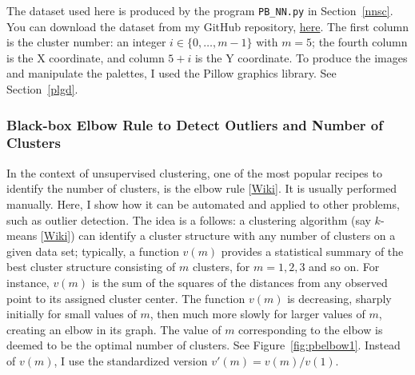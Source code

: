 \documentclass[10pt]{article}
\begin{document}
The dataset used here is produced by the program \texttt{PB\_NN.py} in Section~\ref{nnsc}. You can download the dataset from my
GitHub repository, \href{https://github.com/VincentGranville/Point-Processes/blob/main/Data/PB_NN.txt}{here}. The first column is
the cluster number: an integer $i\in\{0,\dots,m-1\}$ with $m=5$; the fourth column is the X coordinate, and column $5+i$ is the Y coordinate. To produce
the images and manipulate the palettes, I used the Pillow graphics library. See
Section~\ref{plgd}.

\subsubsection{Black-box Elbow Rule to Detect Outliers and Number of Clusters}\label{bbcl}

In the context of unsupervised clustering, one of the most popular recipes to identify the number of clusters, is the 
\textcolor{index}{elbow rule} [\href{https://en.wikipedia.org/wiki/Elbow_method_(clustering)}{Wiki}]. It is usually performed manually. Here, I show how it can be automated and applied to other problems, such as outlier detection. The idea is a follows: a clustering algorithm (say $k$-means 
[\href{https://en.wikipedia.org/wiki/K-means_clustering}{Wiki}]) can identify a cluster structure with any number of clusters on a given data set; typically, a function $v(m)$ provides a statistical summary of the best cluster structure consisting of $m$ clusters, for $m=1,2,3$ and so on. For instance, $v(m)$ is the sum of the squares of the distances from any observed point to its assigned cluster center.
The function $v(m)$ is decreasing, sharply initially for small values of $m$, then much more slowly for larger values of $m$, creating an elbow in its graph.  The value of $m$ corresponding to the elbow is deemed to be the optimal number of clusters. See Figure~\ref{fig:pbelbow1}. Instead of $v(m)$, I use the standardized version $v'(m)=v(m)/v(1)$. \\

\end{document}
